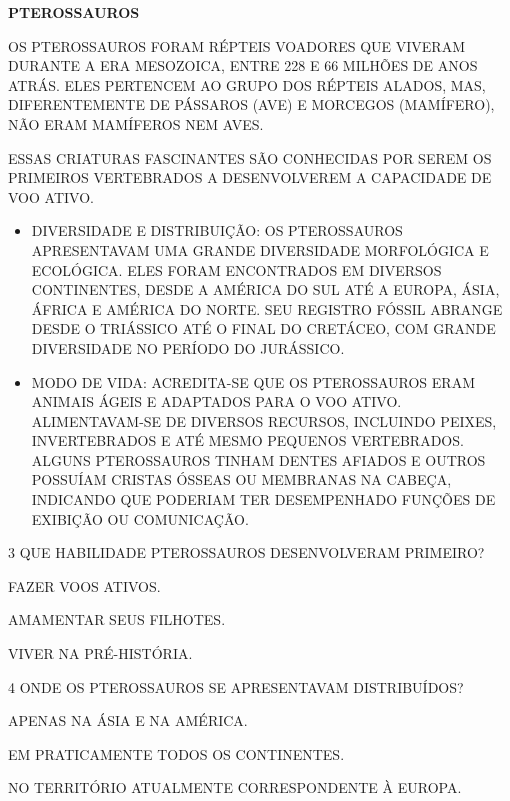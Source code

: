 \begin{myquote}
\textbf{PTEROSSAUROS}

OS PTEROSSAUROS FORAM RÉPTEIS VOADORES QUE VIVERAM DURANTE A ERA MESOZOICA, ENTRE 228 E 66 MILHÕES DE ANOS ATRÁS. ELES PERTENCEM AO GRUPO DOS RÉPTEIS ALADOS, MAS, DIFERENTEMENTE DE PÁSSAROS (AVE) E MORCEGOS (MAMÍFERO), NÃO ERAM MAMÍFEROS NEM AVES.

ESSAS CRIATURAS FASCINANTES SÃO CONHECIDAS POR SEREM OS PRIMEIROS VERTEBRADOS A DESENVOLVEREM A CAPACIDADE DE VOO ATIVO.


\begin{itemize}
\item DIVERSIDADE E DISTRIBUIÇÃO:
OS PTEROSSAUROS APRESENTAVAM UMA GRANDE DIVERSIDADE MORFOLÓGICA E ECOLÓGICA. ELES FORAM ENCONTRADOS EM DIVERSOS CONTINENTES, DESDE A AMÉRICA DO SUL ATÉ A EUROPA, ÁSIA, ÁFRICA E AMÉRICA DO NORTE. SEU REGISTRO FÓSSIL ABRANGE DESDE O TRIÁSSICO ATÉ O FINAL DO CRETÁCEO, COM GRANDE DIVERSIDADE NO PERÍODO DO JURÁSSICO.

\item MODO DE VIDA:
ACREDITA-SE QUE OS PTEROSSAUROS ERAM ANIMAIS ÁGEIS E ADAPTADOS PARA O VOO ATIVO. ALIMENTAVAM-SE DE DIVERSOS RECURSOS, INCLUINDO PEIXES, INVERTEBRADOS E ATÉ MESMO PEQUENOS VERTEBRADOS. ALGUNS PTEROSSAUROS TINHAM DENTES AFIADOS E OUTROS POSSUÍAM CRISTAS ÓSSEAS OU MEMBRANAS NA CABEÇA, INDICANDO QUE PODERIAM TER DESEMPENHADO FUNÇÕES DE EXIBIÇÃO OU COMUNICAÇÃO.
\end{itemize}

\end{myquote}

\num{3} QUE HABILIDADE PTEROSSAUROS DESENVOLVERAM PRIMEIRO?

\begin{boxlist}
 FAZER VOOS ATIVOS.

 AMAMENTAR SEUS FILHOTES.

 VIVER NA PRÉ-HISTÓRIA.
\end{boxlist}

\num{4} ONDE OS PTEROSSAUROS SE APRESENTAVAM DISTRIBUÍDOS?

\begin{boxlist}
 APENAS NA ÁSIA E NA AMÉRICA.

 EM PRATICAMENTE TODOS OS CONTINENTES.

 NO TERRITÓRIO ATUALMENTE CORRESPONDENTE À EUROPA.
\end{boxlist}

